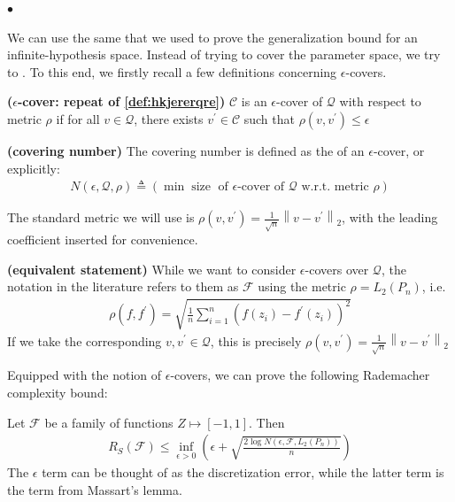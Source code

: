 \documentclass{article}
\newcommand{\bfs}[1]{\textbf{({#1}) }}
\begin{document}
$\bullet$  

We can use the same  that we used to prove the generalization bound for an infinite-hypothesis space. Instead of trying to cover the parameter space, we try to . To this end, we firstly recall a few definitions concerning $\epsilon$-covers.


\begin{defa}\bfs{$\epsilon$-cover: repeat of \cref{def:hkjererqre}}
 $\mathcal{C}$ is an $\epsilon$-cover of $\mathcal{Q}$ with respect to metric $\rho$ if for all $v \in \mathcal{Q}$, there exists $v^{\prime} \in \mathcal{C}$ such that $\rho\left(v, v^{\prime}\right) \leq \epsilon$
\end{defa} 
\begin{defa}\bfs{covering number}
 The covering number is defined as the  of an $\epsilon$-cover, or explicitly:
\begin{align*}
N(\epsilon, \mathcal{Q}, \rho) \triangleq(\min \operatorname{size} \text { of } \epsilon \text {-cover of } \mathcal{Q} \text { w.r.t. metric } \rho)
\end{align*}
\end{defa}
\begin{rema}
The standard metric we will use is $\rho\left(v, v^{\prime}\right)=\frac{1}{\sqrt{n}}\left\|v-v^{\prime}\right\|_{2}$, with the leading coefficient inserted for convenience.
\end{rema}
\begin{rema}\bfs{equivalent statement}
While we want to consider $\epsilon$-covers over $\mathcal{Q}$, the notation in the literature refers to them as  $\mathcal{F}$ using the metric $\rho=L_{2}\left(P_{n}\right)$, i.e.
\begin{align*}
\rho\left(f, f^{\prime}\right)=\sqrt{\frac{1}{n} \sum_{i=1}^{n}\left(f\left(z_{i}\right)-f^{\prime}\left(z_{i}\right)\right)^{2}}
\end{align*}
If we take the corresponding $v, v^{\prime} \in \mathcal{Q}$, this is precisely $\rho\left(v, v^{\prime}\right)=\frac{1}{\sqrt{n}}\left\|v-v^{\prime}\right\|_{2}$
\end{rema} 
Equipped with the notion of $\epsilon$-covers, we can prove the following Rademacher complexity bound:
\begin{thma}\label{thm:frtyzc}
Let $\mathcal{F}$ be a family of functions $Z \mapsto[-1,1] .$ Then
\begin{align*}
R_{S}(\mathcal{F}) \leq \inf _{\epsilon>0}\left(\epsilon+\sqrt{\frac{2 \log N\left(\epsilon, \mathcal{F}, L_{2}\left(P_{n}\right)\right)}{n}}\right)
\end{align*}
The $\epsilon$ term can be thought of as the discretization error, while the latter term is the term from Massart's lemma.
\end{thma} 
\end{document}
